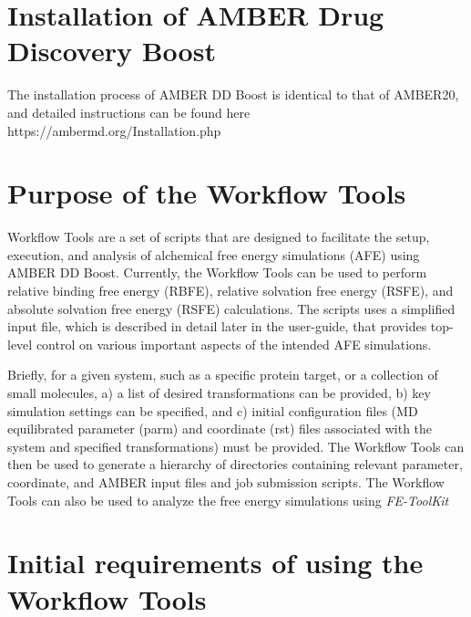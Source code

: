 \documentclass[11pt,letterpaper,titlepage]{article}
\begin{document}
\vspace{0.1cm}
\section {Installation of AMBER Drug Discovery Boost}
\vspace{0.1cm}

The installation process of AMBER DD Boost is identical to that of 
AMBER20, and detailed instructions can be found here 
https://ambermd.org/Installation.php

\vspace{0.1cm}
\section{Purpose of the Workflow Tools}
\vspace{0.1cm}

Workflow Tools are a set of scripts that are designed to 
facilitate the setup, execution, and analysis of alchemical 
free energy simulations (AFE) using AMBER DD Boost. Currently, the 
Workflow Tools can be used to perform relative binding
free energy (RBFE), relative solvation free energy (RSFE), and 
absolute solvation free energy (RSFE) calculations. The scripts
uses a
simplified input file, which is described in detail later in the 
user-guide, that provides top-level control on various important 
aspects of the intended AFE simulations. 

Briefly, for a given system, such as a specific protein target, or 
a collection of small molecules, 
a) a list of desired transformations can be provided, 
b) key simulation settings can be specified, and 
c) initial configuration files (MD equilibrated parameter (parm) and 
coordinate (rst) files associated with the system and
specified transformations) must be provided. 
The Workflow Tools can then be used to generate a hierarchy of directories 
containing relevant parameter, coordinate, and AMBER input files and job submission scripts. 
The Workflow Tools can also be used 
to analyze the free energy simulations using \textit{FE-ToolKit}


\vspace{0.1cm}
\section{Initial requirements of using the Workflow Tools}
\vspace{0.1cm}
\end{document}
